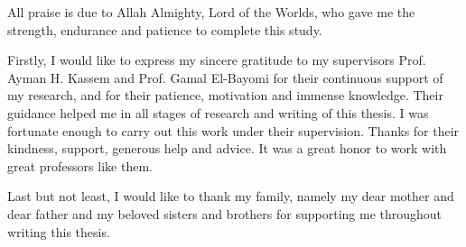 All praise is due to Allah Almighty, Lord of the Worlds, who gave me the strength, endurance and patience to complete this study.

Firstly, I would like to express my sincere gratitude to my supervisors Prof. Ayman H. Kassem and Prof. Gamal El-Bayomi for their continuous support of my research, and for their patience, motivation and immense knowledge. Their guidance helped me in all stages of research and writing of this thesis. I was fortunate enough to carry out this work under their supervision. Thanks for their kindness, support, generous help and advice. It was a great honor to work with great professors like them.

Last but not least, I would like to thank my family, namely my dear mother and dear father and my beloved sisters and brothers for supporting me throughout writing this thesis.


